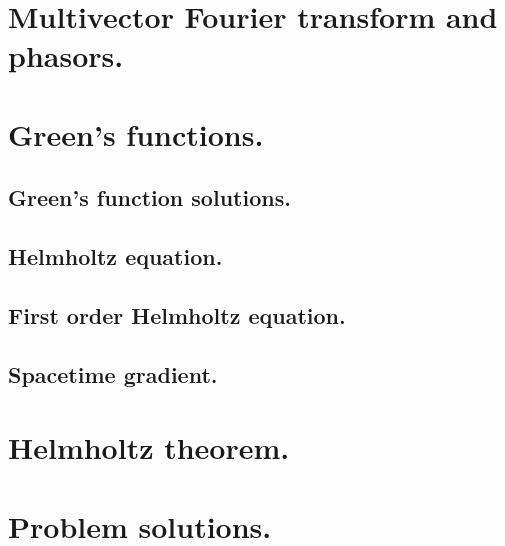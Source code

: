    \section{Multivector Fourier transform and phasors.}
      
   \section{Green's functions.}
      
      \subsection{Green's function solutions.}
         
      \subsection{Helmholtz equation.}
         
      \subsection{First order Helmholtz equation.}
         
      \subsection{Spacetime gradient.}
         
   \section{Helmholtz theorem.}
      
      
   \section{Problem solutions.}
      \shipoutAnswer
